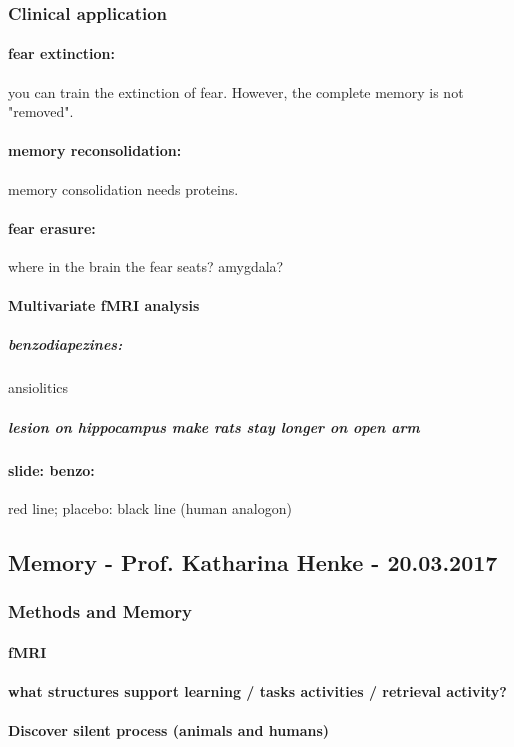\documentclass[12pt,article,oneside,a4paper]{memoir}
\begin{document}
\subsubsection{Clinical application}
\paragraph{fear extinction:} you can train the extinction of fear. However, the complete memory is not "removed".
\paragraph{memory reconsolidation:} memory consolidation needs proteins.
\paragraph{fear erasure:} where in the brain the fear seats? amygdala?

\paragraph{Multivariate fMRI analysis}
\subparagraph{benzodiapezines:} ansiolitics
\subparagraph{lesion on hippocampus make rats stay longer on open arm}
\paragraph{slide: benzo:} red line; placebo: black line (human analogon)

\subsection{Memory - Prof. Katharina Henke - 20.03.2017}
\subsubsection{Methods and Memory}
\paragraph{fMRI}
\paragraph{what structures support learning / tasks activities / retrieval activity?}
\paragraph{Discover silent process (animals and humans)}
\end{document}

